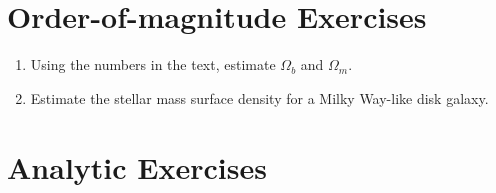 \section{Order-of-magnitude Exercises}

\begin{enumerate} 
\item Using the numbers in the text, estimate $\Omega_b$ and
    $\Omega_m$. 
\item Estimate the stellar mass surface density for a Milky Way-like
disk galaxy.
\end{enumerate} 

\section{Analytic Exercises}

